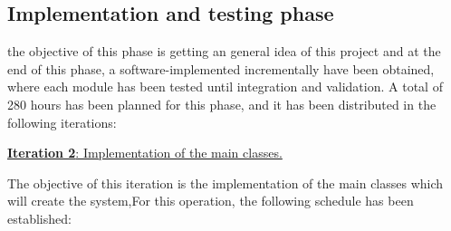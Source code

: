 \subsection{Implementation and testing phase}

the objective of this phase is getting an general idea of this project and at the end of this phase, a software-implemented incrementally have been obtained, where each module has been tested until integration and validation.
A total of 280 hours has been planned for this phase, and it has been distributed in the following iterations:

\large{\underline{\textbf{Iteration 2}: Implementation of the main classes.}}
\vspace{0.3cm}

The objective of this iteration is the implementation of the main classes  which will create the system,For this operation, the following schedule has been established:

